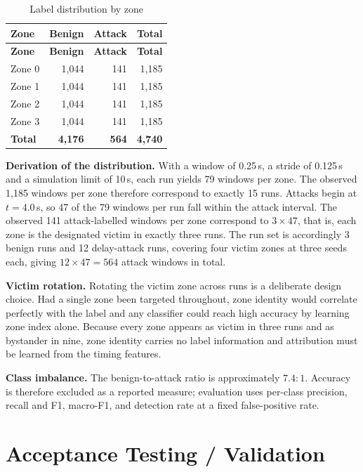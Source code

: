 \begin{longtable}{p{} r r r}
\caption{Label distribution by zone}\label{tab:labels}\\
\toprule
\textbf{Zone} & \textbf{Benign} & \textbf{Attack} & \textbf{Total} \\
\midrule
\endfirsthead
\toprule
\textbf{Zone} & \textbf{Benign} & \textbf{Attack} & \textbf{Total} \\
\midrule
\endhead
Zone 0 & 1{,}044 & 141 & 1{,}185 \\
Zone 1 & 1{,}044 & 141 & 1{,}185 \\
Zone 2 & 1{,}044 & 141 & 1{,}185 \\
Zone 3 & 1{,}044 & 141 & 1{,}185 \\
\midrule
\textbf{Total} & \textbf{4{,}176} & \textbf{564} & \textbf{4{,}740} \\
\bottomrule
\end{longtable}

\textbf{Derivation of the distribution.} With a window of 0.25\,s, a stride of
0.125\,s and a simulation limit of 10\,s, each run yields 79 windows per zone. The
observed 1{,}185 windows per zone therefore correspond to exactly 15 runs. Attacks
begin at $t=4.0$\,s, so 47 of the 79 windows per run fall within the attack interval.
The observed 141 attack-labelled windows per zone correspond to $3 \times 47$, that is,
each zone is the designated victim in exactly three runs. The run set is accordingly
3 benign runs and 12 delay-attack runs, covering four victim zones at three seeds each,
giving $12 \times 47 = 564$ attack windows in total.

\textbf{Victim rotation.} Rotating the victim zone across runs is a deliberate design
choice. Had a single zone been targeted throughout, zone identity would correlate
perfectly with the label and any classifier could reach high accuracy by learning zone
index alone. Because every zone appears as victim in three runs and as bystander in
nine, zone identity carries no label information and attribution must be learned from
the timing features.

\textbf{Class imbalance.} The benign-to-attack ratio is approximately $7.4{:}1$.
Accuracy is therefore excluded as a reported measure; evaluation uses per-class
precision, recall and F1, macro-F1, and detection rate at a fixed false-positive rate.

\section{Acceptance Testing / Validation}
\label{sec:acceptance-validation}

